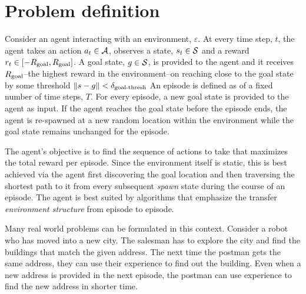 \section{Problem definition}

Consider an agent interacting with an environment, $\varepsilon$. At
every time step, $t$, the agent takes an action $a_t \in \mathcal{A}$, observes a
state, $s_t \in \mathcal{S}$ and a reward $r_t \in [-R_{\text{goal}}, R_{\text{goal}}]$.
A goal state, $g \in \mathcal{S}$, is provided to the agent and it receives
$R_{\text{goal}}$--the highest reward in the environment--on reaching close to the goal
state by some threshold $\|s -g\| < \delta_{\text{goal-thresh}}$
An episode is defined as of a fixed number of time steps, $T$. For
every episode, a new goal state is provided to the agent as input. If the agent
reaches the goal state before the episode ends, the agent is 
re-spawned at a new random location within the environment while the goal state
remains unchanged for the episode.

The agent's objective is to find the sequence of actions to take that maximizes
the total reward per episode. Since the environment itself is static, this is
best achieved via the agent first discovering the goal location and then
traversing the shortest path to it from every subsequent \emph{spawn} state
during the course of an episode. The agent is best suited by algorithms that
emphasize the transfer \emph{environment structure} from episode to episode.



%
%

Many real world problems can be formulated in this context. Consider a robot
who has moved into a new city.
The salesman has to explore the city and find the buildings that match the given
address. The next time the postman gets the same address, they can use their
experience to find out the building. Even when a new address is provided in the
next episode, the postman can use experience to find the new address in shorter
time.

